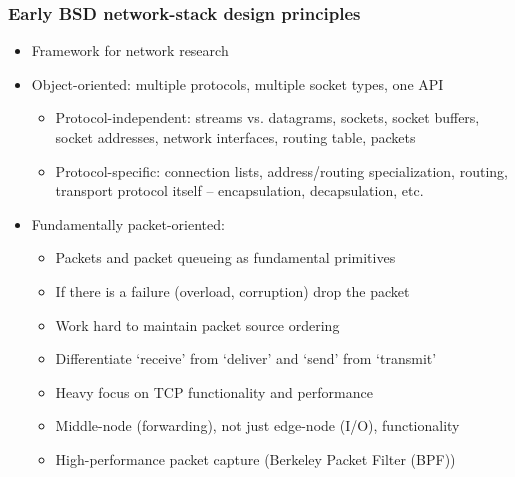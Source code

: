 \begin{frame}
  \frametitle{Early BSD network-stack design principles}

  \begin{itemize}
    \item Framework for network research

    \pause
    \medskip

    \item Object-oriented: multiple protocols, multiple socket types, one API
    \begin{itemize}
      \item Protocol-independent: streams vs. datagrams, sockets, socket
	buffers, socket addresses, network interfaces, routing table, packets
      \item Protocol-specific: connection lists, address/routing specialization,
	routing, transport protocol itself -- encapsulation, decapsulation,
	etc.
    \end{itemize}

    \pause
    \medskip

    \item Fundamentally packet-oriented:
    \begin{itemize}
      \item Packets and packet queueing as fundamental primitives
      \item If there is a failure (overload, corruption) drop the packet
      \item Work hard to maintain packet source ordering
      \item Differentiate `receive' from `deliver' and `send' from `transmit'
      \item Heavy focus on TCP functionality and performance
      \item Middle-node (forwarding), not just edge-node (I/O), functionality 
      \item High-performance packet capture (Berkeley Packet Filter (BPF))
    \end{itemize}
  \end{itemize}
\end{frame}

